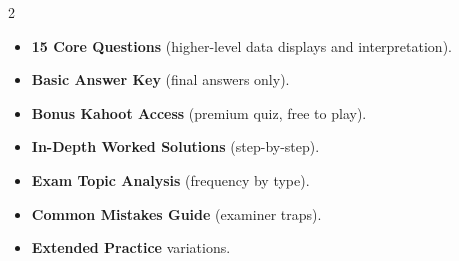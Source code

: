 \documentclass[11pt,a4paper]{article}
\newcommand{\FullReleaseDate}{April 30, 2026}
\begin{document}
\vspace{8pt}

\begin{multicols}{2}
  \begin{tcolorbox}[card, title=\sffamily\bfseries\textcolor{white}{\faHandPointDown\ TODAY (Simplified Version)}, colbacktitle=mainblue, boxed title style={sharp corners, boxrule=0pt}]
    \begin{itemize}[leftmargin=1.2em, itemsep=2pt]
      \item \small \textbf{15 Core Questions} (higher-level data displays and interpretation).
      \item \small \textbf{Basic Answer Key} (final answers only).
      \item \small \textbf{Bonus Kahoot Access} (premium quiz, free to play).
    \end{itemize}
  \end{tcolorbox}

  \columnbreak

  \begin{tcolorbox}[card, title=\sffamily\bfseries\textcolor{white}{\faRocket\ ON \FullReleaseDate\ (Full Upgrade)}, colbacktitle=mainblue, boxed title style={sharp corners, boxrule=0pt}]
    \begin{itemize}[leftmargin=1.2em, itemsep=2pt]
      \item \small \textbf{In-Depth Worked Solutions} (step-by-step).
      \item \small \textbf{Exam Topic Analysis} (frequency by type).
      \item \small \textbf{Common Mistakes Guide} (examiner traps).
      \item \small \textbf{Extended Practice} variations.
    \end{itemize}
  \end{tcolorbox}
\end{multicols}
\end{document}
